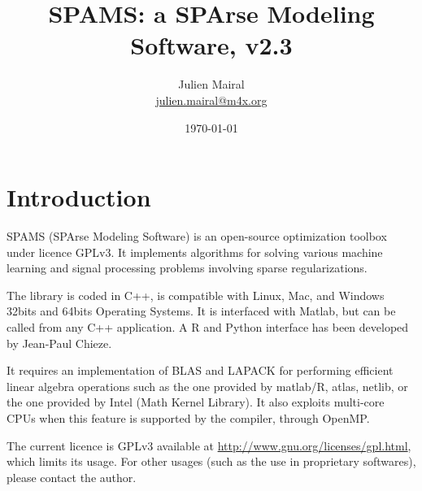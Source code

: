 \documentclass[a4paper, 11pt]{article}
\title{SPAMS: a SPArse Modeling Software, v2.3}
\date{\today}
\author{Julien Mairal \\
   \url{julien.mairal@m4x.org}
}
\begin{document}
\maketitle

\tableofcontents

\section{Introduction}
SPAMS (SPArse Modeling Software) is an open-source optimization toolbox under
licence GPLv3.  It implements algorithms for solving various machine learning
and signal processing problems involving sparse regularizations.

The library is coded in C++, is compatible with Linux, Mac, and Windows 32bits
and 64bits Operating Systems. It is interfaced with Matlab, but can be called
from any C++ application. A R and Python interface has been developed by
Jean-Paul Chieze.

It requires an implementation of BLAS and LAPACK for performing efficient
linear algebra operations such as the one provided by matlab/R, atlas, netlib,
or the one provided by Intel (Math Kernel Library).  It also exploits
multi-core CPUs when this feature is supported by the compiler, through
OpenMP.

The current licence is GPLv3 available at
\url{http://www.gnu.org/licenses/gpl.html}, which limits its usage.  For other
usages (such as the use in proprietary softwares), please contact the author.
\end{document}
